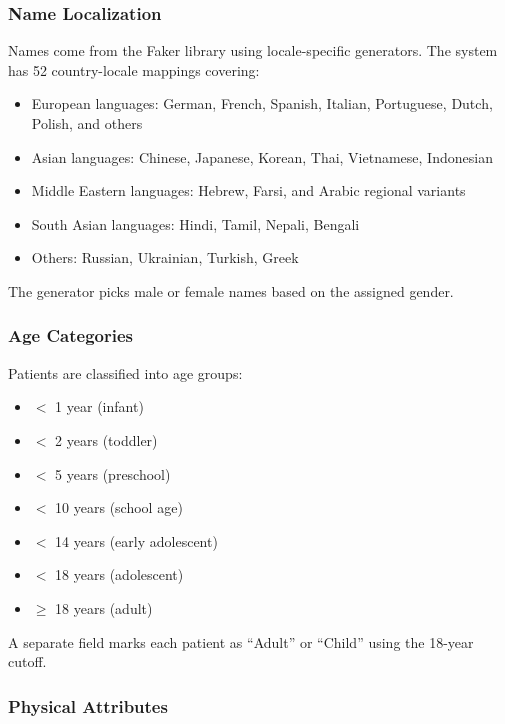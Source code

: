 \subsubsection{Name Localization}

Names come from the Faker library using locale-specific generators. The system has 52 country-locale mappings covering:
\begin{itemize}
    \item European languages: German, French, Spanish, Italian, Portuguese, Dutch, Polish, and others
    \item Asian languages: Chinese, Japanese, Korean, Thai, Vietnamese, Indonesian
    \item Middle Eastern languages: Hebrew, Farsi, and Arabic regional variants
    \item South Asian languages: Hindi, Tamil, Nepali, Bengali
    \item Others: Russian, Ukrainian, Turkish, Greek
\end{itemize}
The generator picks male or female names based on the assigned gender.

\subsubsection{Age Categories}

Patients are classified into age groups:
\begin{itemize}
    \item $<$ 1 year (infant)
    \item $<$ 2 years (toddler)
    \item $<$ 5 years (preschool)
    \item $<$ 10 years (school age)
    \item $<$ 14 years (early adolescent)
    \item $<$ 18 years (adolescent)
    \item $\geq$ 18 years (adult)
\end{itemize}
A separate field marks each patient as ``Adult'' or ``Child'' using the 18-year cutoff.

\subsubsection{Physical Attributes}


